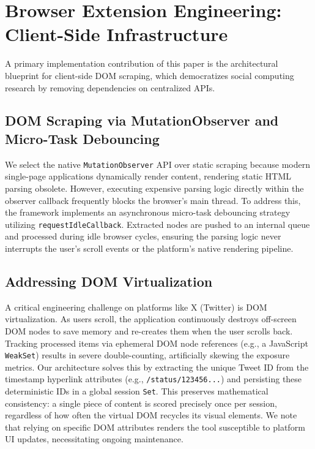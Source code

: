 \documentclass[10pt, conference, compsoc]{IEEEtran}
\begin{document}

\section{Browser Extension Engineering: Client-Side Infrastructure}
A primary implementation contribution of this paper is the architectural blueprint for client-side DOM scraping, which democratizes social computing research by removing dependencies on centralized APIs.

\subsection{DOM Scraping via MutationObserver and Micro-Task Debouncing}
We select the native \texttt{MutationObserver} API over static scraping because modern single-page applications dynamically render content, rendering static HTML parsing obsolete. However, executing expensive parsing logic directly within the observer callback frequently blocks the browser's main thread. To address this, the framework implements an asynchronous micro-task debouncing strategy utilizing \texttt{requestIdleCallback}. Extracted nodes are pushed to an internal queue and processed during idle browser cycles, ensuring the parsing logic never interrupts the user's scroll events or the platform's native rendering pipeline.

\subsection{Addressing DOM Virtualization}
A critical engineering challenge on platforms like X (Twitter) is DOM virtualization. As users scroll, the application continuously destroys off-screen DOM nodes to save memory and re-creates them when the user scrolls back. Tracking processed items via ephemeral DOM node references (e.g., a JavaScript \texttt{WeakSet}) results in severe double-counting, artificially skewing the exposure metrics. Our architecture solves this by extracting the unique Tweet ID from the timestamp hyperlink attributes (e.g., \texttt{/status/123456...}) and persisting these deterministic IDs in a global session \texttt{Set}. This preserves mathematical consistency: a single piece of content is scored precisely once per session, regardless of how often the virtual DOM recycles its visual elements. We note that relying on specific DOM attributes renders the tool susceptible to platform UI updates, necessitating ongoing maintenance.
\end{document}
